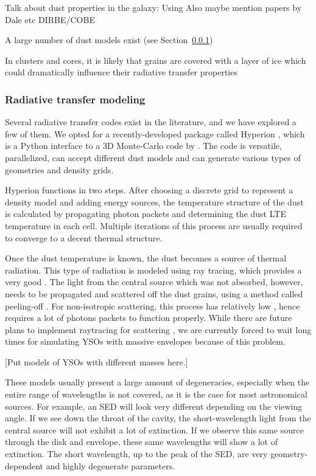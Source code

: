 Talk about dust properties in the galaxy: \citep{Collaboration:2014dz} Using
Also maybe mention papers by Dale etc DIRBE/COBE

A large number of dust models exist (see Section~\ref{subsubsec:radiative})

In clusters and cores, it is likely that grains are covered with a layer of ice which could dramatically influence their radiative transfer properties

\subsubsection{Radiative transfer modeling}
\label{subsubsec:radiative}

Several radiative transfer codes exist in the literature, and we have explored a few of them. We opted for a recently-developed package called Hyperion \citep{Robitaille:2011fc}, which is a Python interface to a 3D Monte-Carlo code by \citet{Whitney:2013cw}. The code is versatile, parallelized, can accept different dust models and can generate various types of geometries and density grids.

Hyperion functions in two steps. After choosing a discrete grid to represent a density model and adding energy sources, the temperature structure of the dust is calculated by propagating photon packets and determining the dust LTE temperature in each cell. Multiple iterations of this process are usually required to converge to a decent thermal structure.

Once the dust temperature is known, the dust becomes a source of thermal radiation. This type of radiation is modeled using ray tracing, which provides a very good \SNR. The light from the central source which was not absorbed, however, needs to be propagated and scattered off the dust grains, using a method called peeling-off \citep{YusefZadeh:1984ff}. For non-isotropic scattering, this process has relatively low \SNR, hence requires a lot of photons packets to function properly. While there are future plans to implement raytracing for scattering \citep{Robitaille:2011fc}, we are currently forced to wait long times for simulating YSOs with massive envelopes because of this problem.

[Put models of YSOs with different masses here.]

These models usually present a large amount of degeneracies, especially when the entire range of wavelengths is not covered, as it is the case for most astronomical sources. For example, an SED will look very different depending on the viewing angle. If we see down the throat of the cavity, the short-wavelength light from the central source will not exhibit a lot of extinction. If we observe this same source through the disk and envelope, these same wavelengths will show a lot of extinction. The short wavelength, up to the peak of the SED, are very geometry-dependent and highly degenerate parameters.

